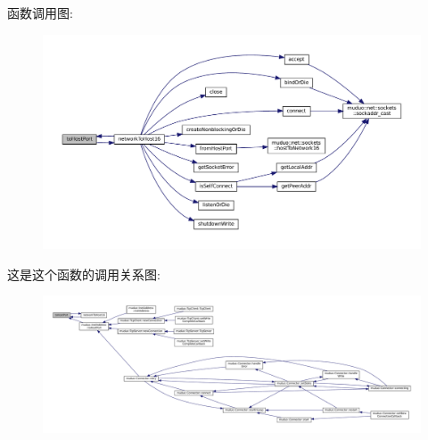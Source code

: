 函数调用图\+:
\nopagebreak
\begin{figure}[H]
\begin{center}
\leavevmode
\includegraphics[width=350pt]{namespacemuduo_1_1sockets_adbdc909d04fd53860d9175b51755b0ae_cgraph}
\end{center}
\end{figure}
这是这个函数的调用关系图\+:
\nopagebreak
\begin{figure}[H]
\begin{center}
\leavevmode
\includegraphics[width=350pt]{namespacemuduo_1_1sockets_adbdc909d04fd53860d9175b51755b0ae_icgraph}
\end{center}
\end{figure}
